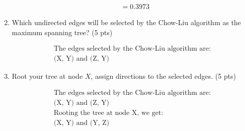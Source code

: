 \documentclass[a4paper]{article}
\theoremstyle{definition}
\newenvironment{soln}{
	\leavevmode\color{blue}\ignorespaces
}{}
\begin{document}
\begin{enumerate}
\begin{soln}
\begin{align*}
				   &=0.3973
		\end{align*}
	\end{soln}
	\item Which undirected edges will be selected by the Chow-Liu algorithm as the maximum spanning tree? (5 pts)
	\begin{soln}
		\begin{align*}
			\text{The edges selected by the Chow-Liu algorithm are:}\\
			\text{(X, Y) and (Z, Y)}
		\end{align*}
	\end{soln}
	\item Root your tree at node $X$, assign directions to the selected edges. (5 pts)
	\begin{soln}
		\begin{align*}
			\text{The edges selected by the Chow-Liu algorithm are:}\\
			\text{(X, Y) and (Z, Y)}\\
			\text{Rooting the tree at node X, we get:}\\
			\text{(X, Y) and (Y, Z)}
		\end{align*}
	\end{soln}
\end{enumerate}

	
	
\end{document}
